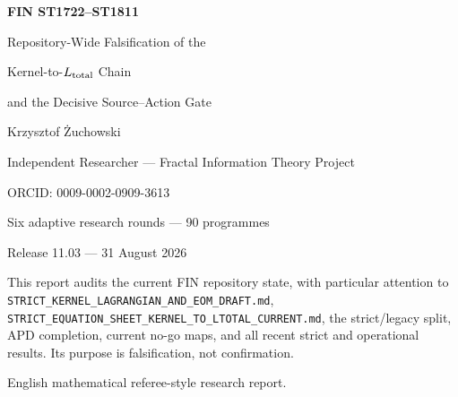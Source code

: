 \documentclass[11pt,a4paper]{article}
\begin{document}
\begin{titlepage}\centering\vspace*{13mm}
{\Huge\bfseries FIN ST1722--ST1811\par}\vspace{4mm}
{\LARGE Repository-Wide Falsification of the\par}\vspace{2mm}
{\LARGE Kernel-to-$L_{\rm total}$ Chain\par}\vspace{2mm}
{\Large and the Decisive Source--Action Gate\par}\vspace{11mm}
{\Large Krzysztof \.Zuchowski\par}
{\normalsize Independent Researcher --- Fractal Information Theory Project\par}
{\normalsize ORCID: 0009-0002-0909-3613\par}\vspace{9mm}
{\large Six adaptive research rounds --- 90 programmes\par}
{\large Release 11.03 --- 31 August 2026\par}
\vfill
\begin{minipage}{.88\textwidth}\small
This report audits the current FIN repository state, with particular attention
to \texttt{STRICT\_KERNEL\_LAGRANGIAN\_AND\_EOM\_DRAFT.md},
\texttt{STRICT\_EQUATION\_SHEET\_KERNEL\_TO\_LTOTAL\_CURRENT.md}, the
strict/legacy split, APD completion, current no-go maps, and all recent strict
and operational results.  Its purpose is falsification, not confirmation.
\end{minipage}\vfill
{\small English mathematical referee-style research report.}
\end{titlepage}
\end{document}
